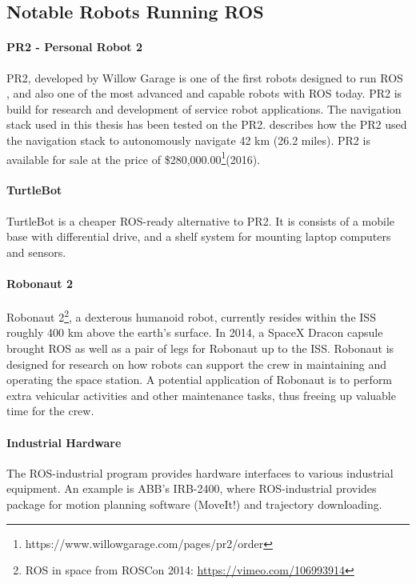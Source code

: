 \subsection{Notable Robots Running ROS}

\paragraph{PR2 - Personal Robot 2}

PR2, developed by Willow Garage is one of the first robots designed to run \ac{ROS} \cite{rosbook15}, and also one of the most advanced and capable robots with \ac{ROS} today. PR2 is build for research and development of service robot applications. The navigation stack used in this thesis has been tested on the PR2. \cite{tbd} describes how the PR2 used the navigation stack to autonomously navigate 42 km (26.2 miles). PR2 is available for sale at the price of \$280,000.00\footnote{https://www.willowgarage.com/pages/pr2/order}(2016).

\paragraph{TurtleBot} 

TurtleBot is a cheaper ROS-ready alternative to PR2. It is consists of a mobile base with differential drive, and a shelf system for mounting laptop computers and sensors.

\paragraph{Robonaut 2}

Robonaut 2\footnote{\ac{ROS} in space from ROSCon 2014: \url{https://vimeo.com/106993914}}, a dexterous humanoid robot, currently resides within the \ac{ISS} roughly 400 km above the earth's surface. In 2014, a SpaceX Dracon capsule brought \ac{ROS} as well as a pair of legs for Robonaut up to the \ac{ISS}\cite{ROS_space}. Robonaut is designed for research on how robots can support the crew in maintaining and operating the space station. A potential application of Robonaut is to perform extra vehicular activities and other maintenance tasks, thus freeing up valuable time for the crew.

\paragraph{Industrial Hardware}

The ROS-industrial program\cite{ROS_industrial} provides hardware interfaces to various industrial equipment. An example is ABB's IRB-2400, where \ac{ROS}-industrial provides package for motion planning software (MoveIt!) and trajectory downloading\cite{ROS_industria_hardware}. 

